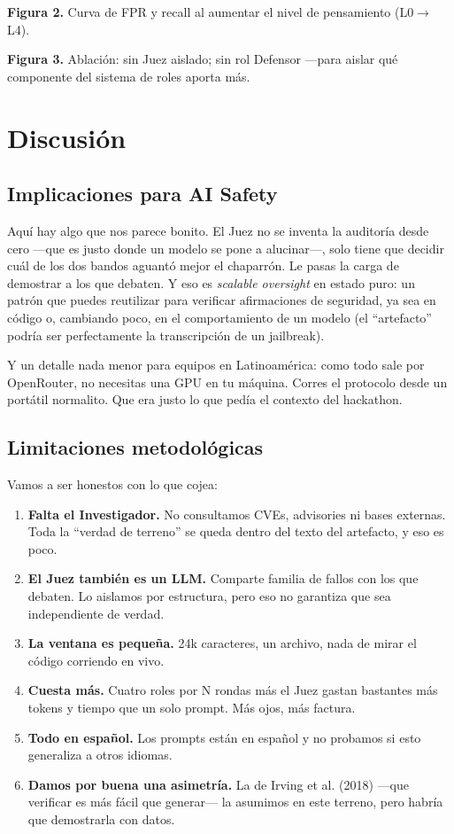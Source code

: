 \documentclass[10pt]{article}
\begin{document}
\textbf{Figura 2.} Curva de FPR y recall al aumentar el nivel de pensamiento
(L0$\rightarrow$L4).

\textbf{Figura 3.} Ablación: sin Juez aislado; sin rol Defensor ---para aislar qué
componente del sistema de roles aporta más.

\section{Discusión}

\subsection{Implicaciones para AI Safety}

Aquí hay algo que nos parece bonito. El Juez no se inventa la auditoría desde cero ---que
es justo donde un modelo se pone a alucinar---, solo tiene que decidir cuál de los dos
bandos aguantó mejor el chaparrón. Le pasas la carga de demostrar a los que debaten. Y
eso es \textit{scalable oversight} en estado puro: un patrón que puedes reutilizar para
verificar afirmaciones de seguridad, ya sea en código o, cambiando poco, en el
comportamiento de un modelo (el ``artefacto'' podría ser perfectamente la transcripción
de un jailbreak).

Y un detalle nada menor para equipos en Latinoamérica: como todo sale por OpenRouter, no
necesitas una GPU en tu máquina. Corres el protocolo desde un portátil normalito. Que
era justo lo que pedía el contexto del hackathon.

\subsection{Limitaciones metodológicas}

Vamos a ser honestos con lo que cojea:

\begin{enumerate}[leftmargin=*]
  \item \textbf{Falta el Investigador.} No consultamos CVEs, advisories ni bases
  externas. Toda la ``verdad de terreno'' se queda dentro del texto del artefacto, y eso
  es poco.
  \item \textbf{El Juez también es un LLM.} Comparte familia de fallos con los que
  debaten. Lo aislamos por estructura, pero eso no garantiza que sea independiente de
  verdad.
  \item \textbf{La ventana es pequeña.} 24k caracteres, un archivo, nada de mirar el
  código corriendo en vivo.
  \item \textbf{Cuesta más.} Cuatro roles por N rondas más el Juez gastan bastantes más
  tokens y tiempo que un solo prompt. Más ojos, más factura.
  \item \textbf{Todo en español.} Los prompts están en español y no probamos si esto
  generaliza a otros idiomas.
  \item \textbf{Damos por buena una asimetría.} La de Irving et al. (2018) ---que
  verificar es más fácil que generar--- la asumimos en este terreno, pero habría que
  demostrarla con datos.
\end{enumerate}
\end{document}
